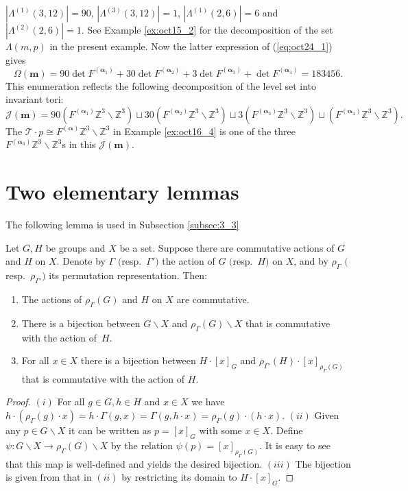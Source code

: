 \documentclass[pdftex]{sigma}
\newcommand{\Z}{{\mathbb Z}}
\newcommand\boa{\boldsymbol{\alpha}}
\newcommand{\m}{{\boldsymbol m}}
\begin{document}
\begin{example}
$|\Lambda^{(1)}(3,12)| = 90$, $|\Lambda^{(3)}(3,12)| = 1$, $|\Lambda^{(1)}(2,6)| = 6$ and $|\Lambda^{(2)}(2,6)| = 1$.
See Example \ref{ex:oct15_2} for the decomposition of the set $\Lambda (m,p)$ in the present example.
Now the latter expression of (\ref{eq:oct24_1}) gives
\begin{equation*}
\Omega(\m) = 90 \det F^{(\boa_1)} + 30 \det F^{(\boa_2)} + 3 \det F^{(\boa_3)} + \det F^{(\boa_4)}=183456.
\end{equation*}
This enumeration ref\/lects the following decomposition of the level set into invariant tori:
\begin{equation*}
{\mathcal J} (\m) = 90 (F^{(\boa_1)} \Z^3 \backslash \Z^3) \sqcup
30 (F^{(\boa_2)} \Z^3 \backslash \Z^3) \sqcup
3 (F^{(\boa_3)} \Z^3 \backslash \Z^3) \sqcup (F^{(\boa_4)} \Z^3 \backslash \Z^3).
\end{equation*}
The ${\mathcal T} \cdot p \cong F^{(\boa)} \Z^3 \backslash \Z^3$ in Example \ref{ex:oct16_4}
is one of the three $F^{(\boa_3)} \Z^3 \backslash \Z^3$s in this ${\mathcal J} (\m)$.
\end{example}

\appendix
\section{Two elementary lemmas}\label{app:A}
The following lemma is used in Subsection \ref{subsec:3_3}
\begin{lemma}\label{lem:apr8_2}
Let $G, H$ be groups and $X$ be a set.
Suppose there are commutative actions of $G$ and $H$ on $X$.
Denote by $\varGamma$ $($resp.~$\varGamma')$ the action of $G$ $($resp.~$H)$ on $X$, and by $\rho_{\varGamma}$ $($resp.~$\rho_{\varGamma'})$
its permutation representation.
Then:
\begin{enumerate}\itemsep=0pt
\item The actions of $\rho_{\varGamma} (G)$ and $H$ on $X$ are commutative.
\item There is a bijection between $G \backslash X$ and $\rho_{\varGamma} (G) \backslash X$ that is commutative with the
action of~$H$.
\item For all $x \in X$ there is a bijection between $H \cdot [x]_G$ and $\rho_{\varGamma'}(H) \cdot  [x]_{\rho_{\varGamma}(G)}$
that is commutative with the action of $H$.
\end{enumerate}
\end{lemma}
\begin{proof}
$(i)$ For all $g \in G, h \in H$ and $x \in X$ we have $h \cdot (\rho_{\varGamma} (g) \cdot x) = h \cdot \varGamma (g, x)
= \varGamma (g, h \cdot x) = \rho_{\varGamma} (g) \cdot (h \cdot x)$.
$(ii)$ Given any $p \in G \backslash X$ it can be written as $p = [x]_G$ with some $x \in X$.
Def\/ine $\psi: G \backslash X \rightarrow \rho_{\varGamma} (G) \backslash X$ by the relation $\psi (p) = [x]_{\rho_{\varGamma} (G)}$.
It is easy to see that this map is well-def\/ined and yields the desired bijection.
$(iii)$ The bijection is given from that in $(ii)$ by restricting its domain to $H \cdot [x]_G$.
\end{proof}
\end{document}
